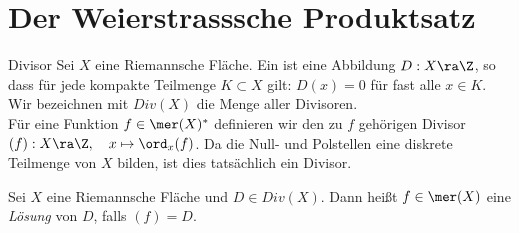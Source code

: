 
\section{Der Weierstrasssche Produktsatz}
\label{sec:Weierstrass}

\begin{defin}{Divisor}
  Sei $X$ eine Riemannsche Fläche. Ein  ist eine
  Abbildung $D: X \ra \Z$, so dass für jede kompakte Teilmenge $K
  \subset X$ gilt: $D(x) = 0$ für fast alle $x \in K$. \\
  Wir bezeichnen mit $Div(X)$ die Menge aller Divisoren. \\
  Für eine Funktion $f \in \mer(X)^\ast$ definieren wir den zu $f$
  gehörigen Divisor $(f): X \ra \Z, \quad x \mapsto \ord_x(f)$. Da die
  Null- und Polstellen eine diskrete Teilmenge von $X$ bilden, ist
  dies tatsächlich ein Divisor.
\end{defin}

\begin{defin}
  Sei $X$ eine Riemannsche Fläche und $D \in Div(X)$. Dann heißt $f
  \in \mer(X)$ eine \emph{Lösung} von $D$, falls $(f) = D$.
\end{defin}




